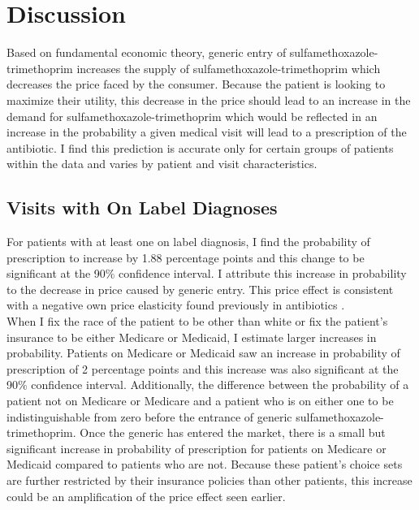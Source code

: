 \chapter{Discussion}
Based on fundamental economic theory, generic entry of sulfamethoxazole-trimethoprim increases the supply of sulfamethoxazole-trimethoprim which decreases the price faced by the consumer. Because the patient is looking to maximize their utility, this decrease in the price should lead to an increase in the demand for sulfamethoxazole-trimethoprim which would be reflected in an increase in the probability a given medical visit will lead to a prescription of the antibiotic. I find this prediction is accurate only for certain groups of patients within the data and varies by patient and visit characteristics.\\
\section{Visits with On Label Diagnoses}
\indent For patients with at least one on label diagnosis, I find the probability of prescription to increase by 1.88 percentage points and this change to be significant at the 90\% confidence interval. I attribute this increase in probability to the decrease in price caused by generic entry. This price effect is consistent with a negative own price elasticity found previously in antibiotics \cite{kaier_impact_2013}.\\
\indent When I fix the race of the patient to be other than white or fix the patient's insurance to be either Medicare or Medicaid, I estimate larger increases in probability. Patients on Medicare or Medicaid saw an increase in probability of prescription of 2 percentage points and this increase was also significant at the 90\% confidence interval. Additionally, the difference between the probability of a patient not on Medicare or Medicare and a patient who is on either one to be indistinguishable from zero before the entrance of generic sulfamethoxazole-trimethoprim. Once the generic has entered the market, there is a small but significant increase in probability of prescription for patients on Medicare or Medicaid compared to patients who are not. Because these patient's choice sets are further restricted by their insurance policies than other patients, this increase could be an amplification of the price effect seen earlier.\\
